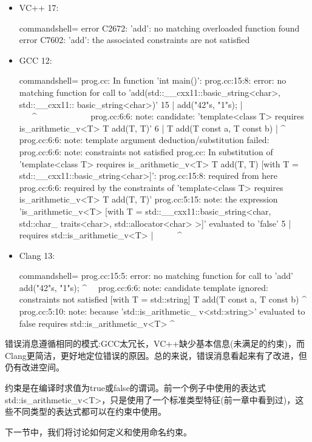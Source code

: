 \begin{itemize}
\item
VC++ 17:

\begin{tcblisting}{commandshell={}}
error C2672: 'add': no matching overloaded function found
error C7602: 'add': the associated constraints are not
satisfied
\end{tcblisting}

\item
GCC 12:

\begin{tcblisting}{commandshell={}}
prog.cc: In function 'int main()':
prog.cc:15:8: error: no matching function for call
to 'add(std::__cxx11::basic_string<char>, std::__cxx11::
basic_string<char>)'
  15 |    add("42"s, "1"s);
     |     ~~~^~~~~~~~~~~~~
prog.cc:6:6: note: candidate: 'template<class T> 
requires is_arithmetic_v<T> T add(T, T)'
  6  |    T add(T const a, T const b)
     |      ^~~
prog.cc:6:6: note: template argument deduction/substitution
 failed:
prog.cc:6:6: note: constraints not satisfied
prog.cc: In substitution of 'template<class
T> requires is_arithmetic_v<T> T add(T, T) [with T =
std::__cxx11::basic_string<char>]':
prog.cc:15:8: required from here
prog.cc:6:6: required by the constraints of
'template<class T> requires is_arithmetic_v<T> T add(T,
T)'
prog.cc:5:15: note: the expression 'is_arithmetic_v<T>
[with T = std::__cxx11::basic_string<char, std::char_
traits<char>, std::allocator<char> >]' evaluated to 'false'
    5 | requires std::is_arithmetic_v<T>
      |               ~~~~~^~~~~~~~~~~~~~~~~~
\end{tcblisting}

\item
Clang 13:

\begin{tcblisting}{commandshell={}}
prog.cc:15:5: error: no matching function for call to
'add'
add("42"s, "1"s);
^~~
prog.cc:6:6: note: candidate template ignored:
constraints not satisfied [with T = std::string]
T add(T const a, T const b)
^
prog.cc:5:10: note: because 'std::is_arithmetic_
v<std::string>' evaluated to false
requires std::is_arithmetic_v<T>
^
\end{tcblisting}
\end{itemize}

错误消息遵循相同的模式:GCC太冗长，VC++缺少基本信息(未满足的约束)，而Clang更简洁，更好地定位错误的原因。总的来说，错误消息看起来有了改进，但仍有改进空间。

约束是在编译时求值为true或false的谓词。前一个例子中使用的表达式std::is\_arithmetic\_v<T>，只是使用了一个标准类型特征(前一章中看到过)，这些不同类型的表达式都可以在约束中使用。

下一节中，我们将讨论如何定义和使用命名约束。
























